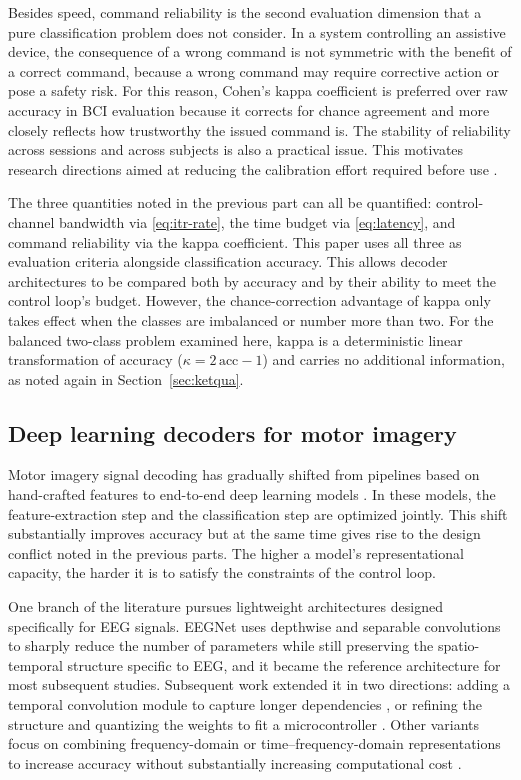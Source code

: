 Besides speed, command reliability is the second evaluation dimension
that a pure classification problem does not consider. In a system
controlling an assistive device, the consequence of a wrong command
is not symmetric with the benefit of a correct command, because a
wrong command may require corrective action or pose a safety risk.
For this reason, Cohen's kappa coefficient is preferred over raw
accuracy in BCI evaluation because it corrects for chance agreement
and more closely reflects how trustworthy the issued command is. The
stability of reliability across sessions and across subjects is also
a practical issue. This motivates research directions aimed at
reducing the calibration effort required before use \cite{wei2023intra}.

The three quantities noted in the previous part can all be
quantified: control-channel bandwidth via \eqref{eq:itr-rate}, the
time budget via \eqref{eq:latency}, and command reliability via the
kappa coefficient. This paper uses all three as evaluation criteria
alongside classification accuracy. This allows decoder architectures
to be compared both by accuracy and by their ability to meet the
control loop's budget. However, the chance-correction advantage of
kappa only takes effect when the classes are imbalanced or number
more than two. For the balanced two-class problem examined here,
kappa is a deterministic linear transformation of accuracy
($\kappa = 2\,\mathrm{acc} - 1$) and carries no additional
information, as noted again in Section~\ref{sec:ketqua}.

\subsection{Deep learning decoders for motor imagery}

Motor imagery signal decoding has gradually shifted from pipelines
based on hand-crafted features to end-to-end deep learning models
\cite{al-saegh2021deep, sadiq2021development}. In these models, the
feature-extraction step and the classification step are optimized
jointly. This shift substantially improves accuracy but at the same
time gives rise to the design conflict noted in the previous parts.
The higher a model's representational capacity, the harder it is to
satisfy the constraints of the control loop.

One branch of the literature pursues lightweight architectures
designed specifically for EEG signals. EEGNet \cite{lawhern2018eegnet}
uses depthwise and separable convolutions to sharply reduce the
number of parameters while still preserving the spatio-temporal
structure specific to EEG, and it became the reference architecture
for most subsequent studies. Subsequent work extended it in two
directions: adding a temporal convolution module to capture longer
dependencies \cite{ingolfsson2020eegtcnet}, or refining the structure
and quantizing the weights to fit a microcontroller
\cite{wang2024mibminet}. Other variants focus on combining
frequency-domain or time--frequency-domain representations to
increase accuracy without substantially increasing computational cost
\cite{deng2021advanced, wang2022mieeg, wang2023ifnet}.

